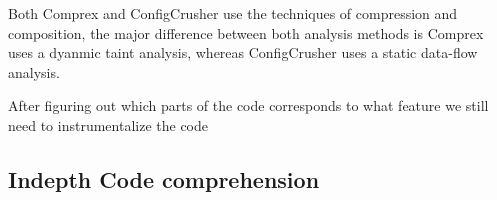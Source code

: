 Both Comprex and ConfigCrusher use the techniques of compression and composition, the major difference between both analysis methods is Comprex uses a dyanmic taint
analysis, whereas ConfigCrusher uses a static data-flow analysis. 


After figuring out which parts of the code corresponds to what feature we still need to instrumentalize the code 

\subsection{Indepth Code comprehension} %